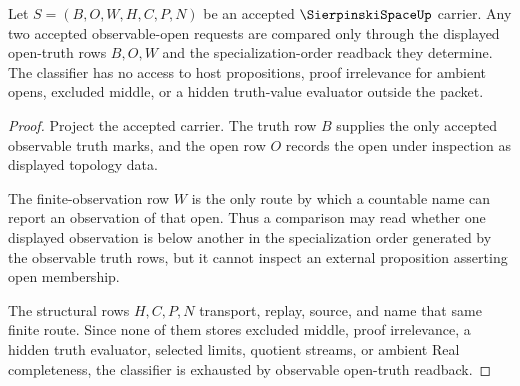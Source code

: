 \begin{theorem}
\label{thm:sierpinski-space-open-set-classifier}
Let $S=(B,O,W,H,C,P,N)$ be an accepted $\SierpinskiSpaceUp$ carrier. Any two accepted observable-open requests are compared only through the displayed open-truth rows $B,O,W$ and the specialization-order readback they determine. The classifier has no access to host propositions, proof irrelevance for ambient opens, excluded middle, or a hidden truth-value evaluator outside the packet.
\end{theorem}
\begin{proof}
Project the accepted carrier. The truth row $B$ supplies the only accepted observable truth marks, and the open row $O$ records the open under inspection as displayed topology data.

The finite-observation row $W$ is the only route by which a countable name can report an observation of that open. Thus a comparison may read whether one displayed observation is below another in the specialization order generated by the observable truth rows, but it cannot inspect an external proposition asserting open membership.

The structural rows $H,C,P,N$ transport, replay, source, and name that same finite route. Since none of them stores excluded middle, proof irrelevance, a hidden truth evaluator, selected limits, quotient streams, or ambient Real completeness, the classifier is exhausted by observable open-truth readback.
\end{proof}

